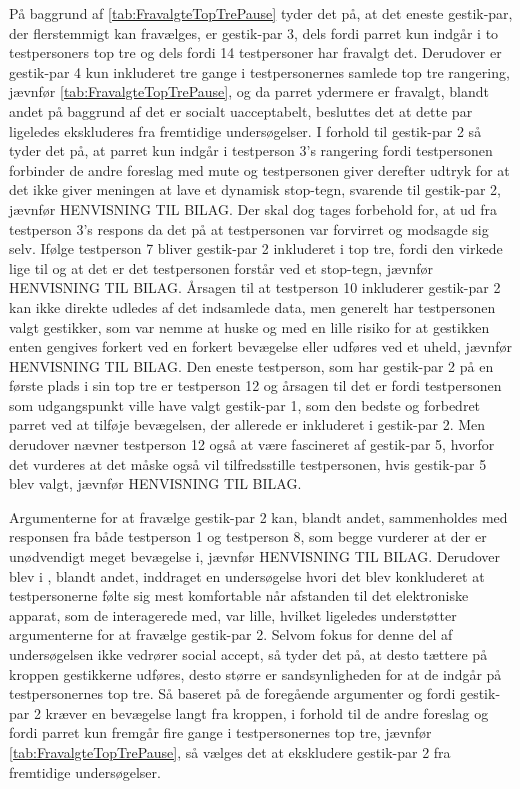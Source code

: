 På baggrund af \autoref{tab:FravalgteTopTrePause} tyder det på, at det eneste gestik-par, der flerstemmigt kan fravælges, er gestik-par 3, dels fordi parret kun indgår i to testpersoners top tre og dels fordi 14 testpersoner har fravalgt det. Derudover er gestik-par 4 kun inkluderet tre gange i testpersonernes samlede top tre rangering, jævnfør \autoref{tab:FravalgteTopTrePause}, og da parret ydermere er fravalgt, blandt andet på baggrund af det er socialt uacceptabelt, besluttes det at dette par ligeledes ekskluderes fra fremtidige undersøgelser. I forhold til gestik-par 2 så tyder det på, at parret kun indgår i testperson 3's rangering fordi testpersonen forbinder de andre foreslag med mute og testpersonen giver derefter udtryk for at det ikke giver meningen at lave et dynamisk stop-tegn, svarende til gestik-par 2, jævnfør HENVISNING TIL BILAG. Der skal dog tages forbehold for, at ud fra testperson 3's respons da det på at testpersonen var forvirret og modsagde sig selv. Ifølge testperson 7 bliver gestik-par 2 inkluderet i top tre, fordi den virkede lige til og at det er det testpersonen forstår ved et stop-tegn, jævnfør HENVISNING TIL BILAG. Årsagen til at testperson 10 inkluderer gestik-par 2 kan ikke direkte udledes af det indsamlede data, men generelt har testpersonen valgt gestikker, som var nemme at huske og med en lille risiko for at gestikken enten gengives forkert ved en forkert bevægelse eller udføres ved et uheld, jævnfør HENVISNING TIL BILAG. Den eneste testperson, som har gestik-par 2 på en første plads i sin top tre er testperson 12 og årsagen til det er fordi testpersonen som udgangspunkt ville have valgt gestik-par 1, som den bedste og forbedret parret ved at tilføje bevægelsen, der allerede er inkluderet i gestik-par 2. Men derudover nævner testperson 12 også at være fascineret af gestik-par 5, hvorfor det vurderes at det måske også vil tilfredsstille testpersonen, hvis gestik-par 5 blev valgt, jævnfør HENVISNING TIL BILAG. 

Argumenterne for at fravælge gestik-par 2 kan, blandt andet, sammenholdes med responsen fra både testperson 1 og testperson 8, som begge vurderer at der er unødvendigt meget bevægelse i, jævnfør HENVISNING TIL BILAG. Derudover blev i , blandt andet, inddraget en undersøgelse hvori det blev konkluderet at testpersonerne følte sig mest komfortable når afstanden til det elektroniske apparat, som de interagerede med, var lille, hvilket ligeledes understøtter argumenterne for at fravælge gestik-par 2. Selvom fokus for denne del af undersøgelsen ikke vedrører social accept, så tyder det på, at desto tættere på kroppen gestikkerne udføres, desto større er sandsynligheden for at de indgår på testpersonernes top tre. Så baseret på de foregående argumenter og fordi gestik-par 2 kræver en bevægelse langt fra kroppen, i forhold til de andre foreslag og fordi parret kun fremgår fire gange i testpersonernes top tre, jævnfør \autoref{tab:FravalgteTopTrePause}, så vælges det at ekskludere gestik-par 2 fra fremtidige undersøgelser.  
